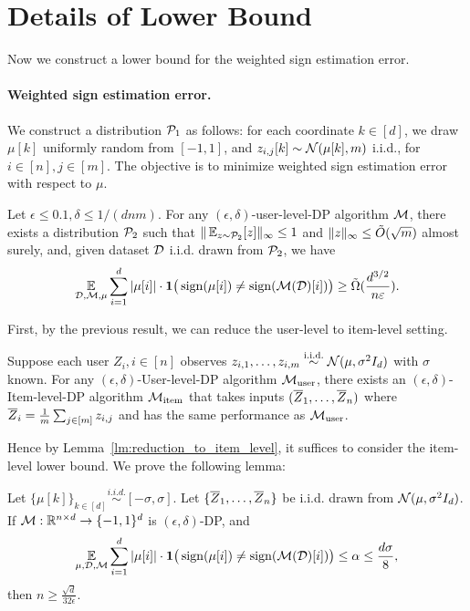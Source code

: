 \newpage
\section{Details of Lower Bound}
\label{sec:lbproof}
Now we construct a lower bound for the weighted sign estimation error.

\paragraph{Weighted sign estimation error.}
We construct a distribution $\mathcal{P}_1$ as follows: for each coordinate $k\in[d]$, we draw $\mu[k]$ uniformly random from $[-1,1]$, and $z_{i,j}[k]\sim\mathcal{N}(\mu[k],m)$ i.i.d., for $i\in[n],j\in[m]$.
The objective is to minimize weighted sign estimation error with respect to $\mu$.

\begin{lemma}
\label{lm:sign_error_lb}
    Let $\epsilon\le 0.1, \delta\le 1/(dnm)$.
    For any $(\epsilon,\delta)$-user-level-DP algorithm $\mathcal{M}$, 
    there exists a distribution $\mathcal{P}_2$ such that $\|\operatorname*{\mathbb{E}}_{z\sim \mathcal{P}_2}[z]\|_\infty\le 1$ and $\|z\|_\infty\le\Tilde{O}(\sqrt{m})$ almost surely, and,
    given dataset $\mathcal{D}$ i.i.d. drawn from $\mathcal{P}_2$, we have
    \begin{align*}
    \operatorname*{\mathbb{E}}_{\mathcal{D},\mathcal{M},\mu}\sum_{i=1}^{d} |\mu[i]|\cdot \mathbf{1}\big(\operatorname{sign}(\mu[i])\neq\operatorname{sign}(\mathcal{M}(\mathcal{D})[i])\big)\ge \Tilde{\Omega}(\frac{d^{3/2}}{n\varepsilon}).
    \end{align*}
\end{lemma}

First, by the previous result, we can reduce the user-level to item-level setting.

\begin{lemma}
\label{lm:reduction_to_item_level}
Suppose each user $Z_i,i\in[n]$ observes $z_{i,1},\ldots,z_{i,m} \stackrel{\text{i.i.d.}}{\sim}\mathcal{N}(\mu,\sigma^2I_d)$ with $\sigma$ known.
For any $(\epsilon,\delta)$-User-level-DP algorithm $\mathcal{M}_{\mathrm{user}}$, there exists an $(\epsilon,\delta)$-Item-level-DP algorithm $\mathcal{M}_{\mathrm{item}}$ that takes inputs $(\overline{Z}_1,\ldots,\overline{Z}_n)$ where $\overline{Z}_i=\frac{1}{m}\sum_{j\in[m]}z_{i,j}$ and has the same performance as $\mathcal{M}_{\mathrm{user}}$.
\end{lemma}

Hence by Lemma~\ref{lm:reduction_to_item_level}, it suffices to consider the item-level lower bound.
We prove the following lemma:

\begin{lemma}
\label{lm:sample_compelexity_lb}
Let $\{\mu[k]\}_{k\in[d]}\stackrel{i.i.d.}{\sim}[-\sigma,\sigma]$.
    Let $\{\overline{Z}_1,\ldots,\overline{Z}_n\}$ be i.i.d. drawn from $\mathcal{N}(\mu,\sigma^2I_d)$.
    If $\mathcal{M}: \mathbb{R}^{n\times d}\to\{-1,1\}^d$ is $(\epsilon,\delta)$-DP, and
    \begin{align*}
        \operatorname*{\mathbb{E}}_{\mu,\mathcal{D},\mathcal{M}}\sum_{i=1}^{d} |\mu[i]|\cdot \mathbf{1}\big(\operatorname{sign}(\mu[i])\neq\operatorname{sign}(\mathcal{M}(\mathcal{D})[i])\big)\le \alpha\le  \frac{d\sigma}{8},
    \end{align*}
    then $n\ge \frac{\sqrt{d}}{32\epsilon}$.
\end{lemma}

